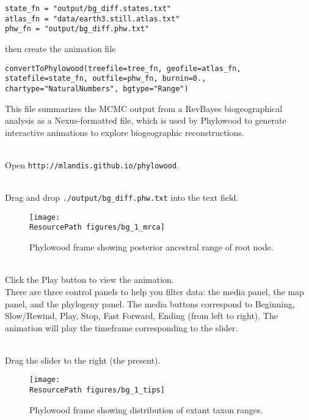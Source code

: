 \begin{snugshade}
\begin{lstlisting}
state_fn = "output/bg_diff.states.txt"
atlas_fn = "data/earth3.still.atlas.txt"
phw_fn = "output/bg_diff.phw.txt"
\end{lstlisting}
\end{snugshade}

then create the animation file

\begin{snugshade}
\begin{lstlisting}
convertToPhylowood(treefile=tree_fn, geofile=atlas_fn, statefile=state_fn, outfile=phw_fn, burnin=0., chartype="NaturalNumbers", bgtype="Range")
\end{lstlisting}
\end{snugshade}

This file summarizes the MCMC output from a RevBayes biogeographical analysis as a Nexus-formatted file, which is used by Phylowood to generate interactive animations to explore biogeographic reconstructions.

\noindent \\ \impmark Open \texttt{http://mlandis.github.io/phylowood}.

\noindent \\ \impmark Drag and drop \texttt{./output/bg\_diff.phw.txt} into the text field.

\begin{figure}[H]
\centering
\texttt{[image: \\ResourcePath figures/bg\_1\_mrca]}
\caption{Phylowood frame showing posterior ancestral range of root node.}
\end{figure}

\noindent \\ \impmark Click the Play button to view the animation. \\

There are three control panels to help you filter data: the media panel, the map panel, and the phylogeny panel.
The media buttons correspond to Beginning, Slow/Rewind, Play, Stop, Fast Forward, Ending (from left to right).
The animation will play the timeframe corresponding to the slider.

\noindent \\ \impmark Drag the slider to the right (the present).

\begin{figure}[H]
\centering
\texttt{[image: \\ResourcePath figures/bg\_1\_tips]}
\caption{Phylowood frame showing distribution of extant taxon ranges.}
\end{figure}

